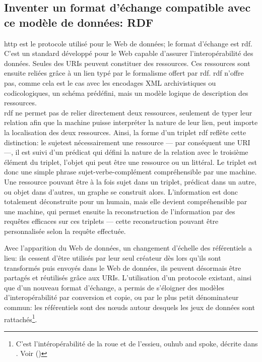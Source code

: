 \subsection{\label{II-A-1-b}Inventer un format d'échange compatible avec ce modèle de données: RDF}

\ac{http} est le protocole utilisé pour le Web de données; le format d'échange est \ac{rdf}. C'est un standard développé pour le Web capable d'assurer l'interopérabilité des données. Seules des URIs peuvent constituer des ressources. Ces ressources sont ensuite reliées grâce à un lien typé par le formalisme offert par \ac{rdf}. \ac{rdf} n'offre pas, comme cela est le cas avec les encodages XML archivistiques ou codicologiques, un schéma prédéfini, mais un modèle logique de description des ressources.\\

\ac{rdf} ne permet pas de relier directement deux ressources, seulement de typer leur relation afin que la machine puisse interpréter la nature de leur lien, peut importe la localisation des deux ressources. Ainsi, la forme d'un triplet \ac{rdf} reflète cette distinction: le \og sujet\fg est nécessairement une ressource --- par conséquent une URI ---, il est suivi d'un \og prédicat\fg{} qui défini la nature de la relation avec le troisième élément du triplet, l'\og objet\fg{} qui peut être une ressource ou un littéral. Le triplet est donc une simple phrase sujet-verbe-complément compréhensible par une machine. Une ressource pouvant être à la fois sujet dans un triplet, prédicat dans un autre, ou objet dans d'autres, un graphe se construit alors. L'information est donc totalement déconstruite pour un humain, mais elle devient compréhensible par une machine, qui permet ensuite la reconstruction de l'information par des requêtes efficaces sur ces triplets --- cette reconstruction pouvant être personnalisée selon la requête effectuée.

\bigskip
\bigskip
Avec l'apparition du Web de données, un changement d'échelle des référentiels a lieu: ils cessent d'être utilisés par leur seul créateur dès lors qu'ils sont transformés puis envoyés dans le Web de données, ils peuvent désormais être partagés et réutilisés grâce aux URIs. L'utilisation d'un protocole existant, ainsi que d'un nouveau format d'échange, a permis de s'éloigner des modèles d'interopérabilité par conversion et copie, ou par le plus petit dénominateur commun: les référentiels sont des nœuds autour desquels les jeux de données sont rattachés\footnote{C'est l'intéropérabilité de la \og roue et de l'essieu\fg{}, ou\og hub and spoke\fg{}, décrite dans \cite{bermes_2_2013}. Voir  ()}. 